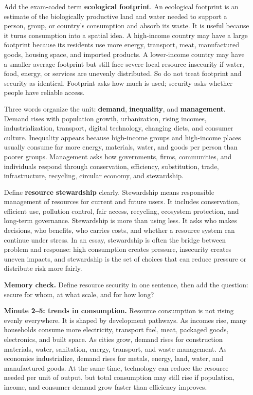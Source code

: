 \documentclass[11pt,a4paper]{article}
\newcommand{\term}[1]{\textcolor{HeadingBlue}{\textbf{#1}}}
\begin{document}
Add the exam-coded term \term{ecological footprint}. An ecological footprint is
an estimate of the biologically productive land and water needed to support a
person, group, or country's consumption and absorb its waste. It is useful
because it turns consumption into a spatial idea. A high-income country may have
a large footprint because its residents use more energy, transport, meat,
manufactured goods, housing space, and imported products. A lower-income country
may have a smaller average footprint but still face severe local resource
insecurity if water, food, energy, or services are unevenly distributed. So do
not treat footprint and security as identical. Footprint asks how much is used;
security asks whether people have reliable access.

Three words organize the unit: \term{demand}, \term{inequality}, and
\term{management}. Demand rises with population growth, urbanization, rising
incomes, industrialization, transport, digital technology, changing diets, and
consumer culture. Inequality appears because high-income groups and high-income
places usually consume far more energy, materials, water, and goods per person
than poorer groups. Management asks how governments, firms, communities, and
individuals respond through conservation, efficiency, substitution, trade,
infrastructure, recycling, circular economy, and stewardship.

Define \term{resource stewardship} clearly. Stewardship means responsible
management of resources for current and future users. It includes conservation,
efficient use, pollution control, fair access, recycling, ecosystem protection,
and long-term governance. Stewardship is more than using less. It asks who makes
decisions, who benefits, who carries costs, and whether a resource system can
continue under stress. In an essay, stewardship is often the bridge between
problem and response: high consumption creates pressure, insecurity creates
uneven impacts, and stewardship is the set of choices that can reduce pressure
or distribute risk more fairly.

\textbf{Memory check.} Define resource security in one sentence, then add the
question: secure for whom, at what scale, and for how long?

\textbf{Minute 2--5: trends in consumption.}
Resource consumption is not rising evenly everywhere. It is shaped by
development pathways. As incomes rise, many households consume more electricity,
transport fuel, meat, packaged goods, electronics, and built space. As cities
grow, demand rises for construction materials, water, sanitation, energy,
transport, and waste management. As economies industrialize, demand rises for
metals, energy, land, water, and manufactured goods. At the same time,
technology can reduce the resource needed per unit of output, but total
consumption may still rise if population, income, and consumer demand grow
faster than efficiency improves.
\end{document}

